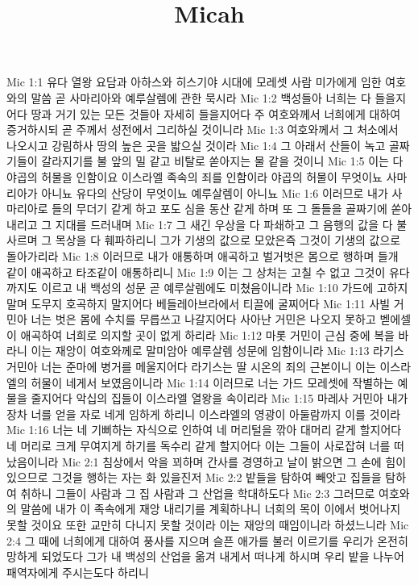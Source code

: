 

\title{Micah}

Mic 1:1  유다 열왕 요담과 아하스와 히스기야 시대에 모레셋 사람 미가에게 임한 여호와의 말씀 곧 사마리아와 예루살렘에 관한 묵시라
Mic 1:2  백성들아 너희는 다 들을지어다 땅과 거기 있는 모든 것들아 자세히 들을지어다 주 여호와께서 너희에게 대하여 증거하시되 곧 주께서 성전에서 그리하실 것이니라
Mic 1:3  여호와께서 그 처소에서 나오시고 강림하사 땅의 높은 곳을 밟으실 것이라
Mic 1:4  그 아래서 산들이 녹고 골짜기들이 갈라지기를 불 앞의 밀 같고 비탈로 쏟아지는 물 같을 것이니
Mic 1:5  이는 다 야곱의 허물을 인함이요 이스라엘 족속의 죄를 인함이라 야곱의 허물이 무엇이뇨 사마리아가 아니뇨 유다의 산당이 무엇이뇨 예루살렘이 아니뇨
Mic 1:6  이러므로 내가 사마리아로 들의 무더기 같게 하고 포도 심을 동산 같게 하며 또 그 돌들을 골짜기에 쏟아 내리고 그 지대를 드러내며
Mic 1:7  그 새긴 우상을 다 파쇄하고 그 음행의 값을 다 불사르며 그 목상을 다 훼파하리니 그가 기생의 값으로 모았은즉 그것이 기생의 값으로 돌아가리라
Mic 1:8  이러므로 내가 애통하며 애곡하고 벌거벗은 몸으로 행하며 들개 같이 애곡하고 타조같이 애통하리니
Mic 1:9  이는 그 상처는 고칠 수 없고 그것이 유다까지도 이르고 내 백성의 성문 곧 예루살렘에도 미쳤음이니라
Mic 1:10  가드에 고하지 말며 도무지 호곡하지 말지어다 베들레아브라에서 티끌에 굴찌어다
Mic 1:11  사빌 거민아 너는 벗은 몸에 수치를 무릅쓰고 나갈지어다 사아난 거민은 나오지 못하고 벧에셀이 애곡하여 너희로 의지할 곳이 없게 하리라
Mic 1:12  마롯 거민이 근심 중에 복을 바라니 이는 재앙이 여호와께로 말미암아 예루살렘 성문에 임함이니라
Mic 1:13  라기스 거민아 너는 준마에 병거를 메울지어다 라기스는 딸 시온의 죄의 근본이니 이는 이스라엘의 허물이 네게서 보였음이니라
Mic 1:14  이러므로 너는 가드 모레셋에 작별하는 예물을 줄지어다 악십의 집들이 이스라엘 열왕을 속이리라
Mic 1:15  마레사 거민아 내가 장차 너를 얻을 자로 네게 임하게 하리니 이스라엘의 영광이 아둘람까지 이를 것이라
Mic 1:16  너는 네 기뻐하는 자식으로 인하여 네 머리털을 깎아 대머리 같게 할지어다 네 머리로 크게 무여지게 하기를 독수리 같게 할지어다 이는 그들이 사로잡혀 너를 떠났음이니라
Mic 2:1  침상에서 악을 꾀하며 간사를 경영하고 날이 밝으면 그 손에 힘이 있으므로 그것을 행하는 자는 화 있을진저
Mic 2:2  밭들을 탐하여 빼앗고 집들을 탐하여 취하니 그들이 사람과 그 집 사람과 그 산업을 학대하도다
Mic 2:3  그러므로 여호와의 말씀에 내가 이 족속에게 재앙 내리기를 계획하나니 너희의 목이 이에서 벗어나지 못할 것이요 또한 교만히 다니지 못할 것이라 이는 재앙의 때임이니라 하셨느니라
Mic 2:4  그 때에 너희에게 대하여 풍사를 지으며 슬픈 애가를 불러 이르기를 우리가 온전히 망하게 되었도다 그가 내 백성의 산업을 옮겨 내게서 떠나게 하시며 우리 밭을 나누어 패역자에게 주시는도다 하리니
